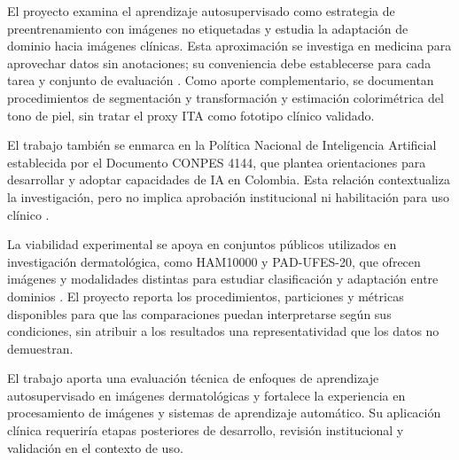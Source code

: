 El proyecto examina el aprendizaje autosupervisado como estrategia de preentrenamiento con imágenes no etiquetadas y estudia la adaptación de dominio hacia imágenes clínicas. Esta aproximación se investiga en medicina para aprovechar datos sin anotaciones; su conveniencia debe establecerse para cada tarea y conjunto de evaluación \parencite{krishnan2022selfsupervisedmedicine}. Como aporte complementario, se documentan procedimientos de segmentación y transformación y estimación colorimétrica del tono de piel, sin tratar el proxy ITA como fototipo clínico validado.

El trabajo también se enmarca en la Política Nacional de Inteligencia Artificial establecida por el Documento CONPES 4144, que plantea orientaciones para desarrollar y adoptar capacidades de IA en Colombia. Esta relación contextualiza la investigación, pero no implica aprobación institucional ni habilitación para uso clínico \parencite{dnp2025conpes4144}.

La viabilidad experimental se apoya en conjuntos públicos utilizados en investigación dermatológica, como HAM10000 y PAD-UFES-20, que ofrecen imágenes y modalidades distintas para estudiar clasificación y adaptación entre dominios \parencite{tschandl2018ham10000,pacheco2020padufes}. El proyecto reporta los procedimientos, particiones y métricas disponibles para que las comparaciones puedan interpretarse según sus condiciones, sin atribuir a los resultados una representatividad que los datos no demuestran.

El trabajo aporta una evaluación técnica de enfoques de aprendizaje autosupervisado en imágenes dermatológicas y fortalece la experiencia en procesamiento de imágenes y sistemas de aprendizaje automático. Su aplicación clínica requeriría etapas posteriores de desarrollo, revisión institucional y validación en el contexto de uso.
